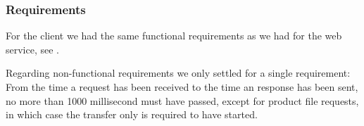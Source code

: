 \subsubsection{Requirements}
For the client we had the same functional requirements as we had for the web service, see .

Regarding non-functional requirements we only settled for a single requirement: From the time a request has been received to the time an response has been sent, no more than 1000 millisecond must have passed, except for product file requests, in which case the transfer only is required to have started.